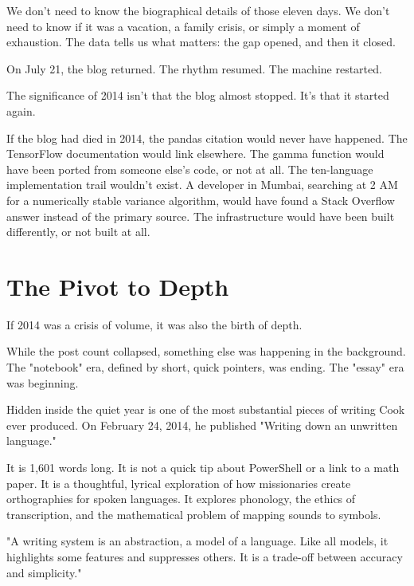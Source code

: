 We don't need to know the biographical details of those eleven days. We don't need to know if it was a vacation, a family crisis, or simply a moment of exhaustion. The data tells us what matters: the gap opened, and then it closed.

On July 21, the blog returned. The rhythm resumed. The machine restarted.

The significance of 2014 isn't that the blog almost stopped. It's that it started again.


If the blog had died in 2014, the pandas citation would never have happened. The TensorFlow documentation would link elsewhere. The gamma function would have been ported from someone else's code, or not at all. The ten-language implementation trail wouldn't exist. A developer in Mumbai, searching at 2 AM for a numerically stable variance algorithm, would have found a Stack Overflow answer instead of the primary source. The infrastructure would have been built differently, or not built at all.

\bigskip

\section*{The Pivot to Depth}

If 2014 was a crisis of volume, it was also the birth of depth.

While the post count collapsed, something else was happening in the background. The "notebook" era, defined by short, quick pointers, was ending. The "essay" era was beginning.

Hidden inside the quiet year is one of the most substantial pieces of writing Cook ever produced. On February 24, 2014, he published "Writing down an unwritten language."

It is 1,601 words long. It is not a quick tip about PowerShell or a link to a math paper. It is a thoughtful, lyrical exploration of how missionaries create orthographies for spoken languages. It explores phonology, the ethics of transcription, and the mathematical problem of mapping sounds to symbols.

\begin{blogquote}
"A writing system is an abstraction, a model of a language. Like all models, it highlights some features and suppresses others. It is a trade-off between accuracy and simplicity."
\end{blogquote}

